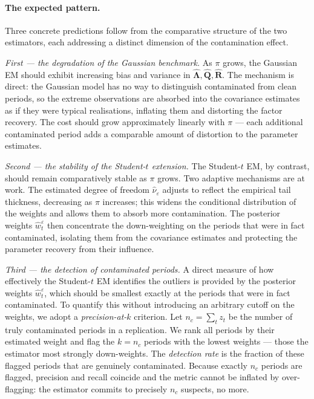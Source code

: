 \documentclass[11pt, a4paper, oneside]{article}
\newcommand{\mR}{\mathbf{R}}
\begin{document}
\paragraph{The expected pattern.}
Three concrete predictions follow from the comparative structure
of the two estimators, each addressing a distinct dimension of
the contamination effect.

\textit{First — the degradation of the Gaussian benchmark.}
As $\pi$ grows, the Gaussian EM should exhibit increasing bias
and variance in
$\hat{\boldsymbol{\Lambda}}, \hat{\mathbf{Q}}, \hat{\mR}$. The
mechanism is direct: the Gaussian model has no way to distinguish
contaminated from clean periods, so the extreme observations are
absorbed into the covariance estimates as if they were typical
realisations, inflating them and distorting the factor recovery.
The cost should grow approximately linearly with $\pi$ — each
additional contaminated period adds a comparable amount of
distortion to the parameter estimates.

\textit{Second — the stability of the Student-$t$ extension.}
The Student-$t$ EM, by contrast, should remain comparatively
stable as $\pi$ grows. Two adaptive mechanisms are at work. The
estimated degree of freedom $\hat{\nu}_\varepsilon$ adjusts to
reflect the empirical tail thickness, decreasing as $\pi$
increases; this widens the conditional distribution of the
weights and allows them to absorb more contamination. The
posterior weights $\hat{w}_t^\varepsilon$ then concentrate the
down-weighting on the periods that were in fact contaminated,
isolating them from the covariance estimates and protecting the
parameter recovery from their influence.

\textit{Third — the detection of contaminated periods.}
A direct measure of how effectively the Student-$t$ EM identifies
the outliers is provided by the posterior weights
$\hat{w}_t^\varepsilon$, which should be smallest exactly at the
periods that were in fact contaminated. To quantify this without
introducing an arbitrary cutoff on the weights, we adopt a
\emph{precision-at-$k$} criterion. Let $n_c = \sum_t z_t$ be the
number of truly contaminated periods in a replication. We rank
all periods by their estimated weight and flag the $k = n_c$
periods with the lowest weights — those the estimator most
strongly down-weights. The \emph{detection rate} is the fraction
of these flagged periods that are genuinely contaminated. Because
exactly $n_c$ periods are flagged, precision and recall coincide
and the metric cannot be inflated by over-flagging: the estimator
commits to precisely $n_c$ suspects, no more.
\end{document}
